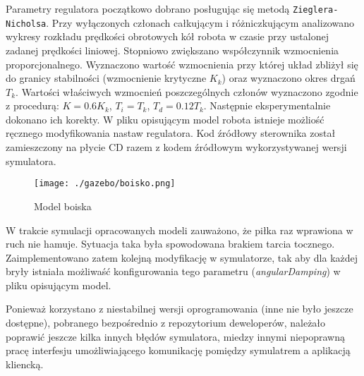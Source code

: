 	Parametry regulatora początkowo dobrano posługując się metodą \texttt{Zieglera-Nicholsa}. Przy wyłączonych członach całkującym i różniczkującym analizowano wykresy rozkładu
	prędkości obrotowych kół robota w czasie przy ustalonej zadanej prędkości liniowej. Stopniowo zwiększano współczynnik wzmocnienia proporcjonalnego. Wyznaczono wartość wzmocnienia
	przy której układ zbliżył się do granicy stabilności (wzmocnienie krytyczne $K_k$) oraz wyznaczono okres drgań $T_k$. 
	Wartości właściwych wzmocnień poszczególnych  członów wyznaczono zgodnie z procedurą: $K=0.6K_k$, $T_i=T_k$, $T_d=0.12T_k$. Następnie eksperymentalnie dokonano ich korekty.
	W pliku opisującym model robota istnieje możliość ręcznego modyfikowania nastaw regulatora.
	Kod źródłowy sterownika został zamieszczony na płycie CD razem z kodem źródłowym wykorzystywanej wersji symulatora.	
	\begin{figure}[H]
	\centering
	\texttt{[image: ./gazebo/boisko.png]}
	\caption{Model boiska}
	\end{figure}
	W trakcie symulacji opracowanych modeli zauważono, że piłka raz wprawiona w ruch nie hamuje. Sytuacja taka była spowodowana brakiem tarcia tocznego. Zaimplementowano zatem kolejną modyfikację w 
	symulatorze, tak aby dla każdej bryły istniała możliwaść konfigurowania tego parametru (\textit{angularDamping}) w pliku opisującym model.

	Ponieważ korzystano z niestabilnej wersji oprogramowania (inne nie było jeszcze dostępne), pobranego bezpośrednio z repozytorium deweloperów, należało poprawić jeszcze kilka innych błędów symulatora,
	miedzy innymi niepoprawną pracę interfesju umożliwiającego komunikację pomiędzy symulatrem a aplikacją kliencką.